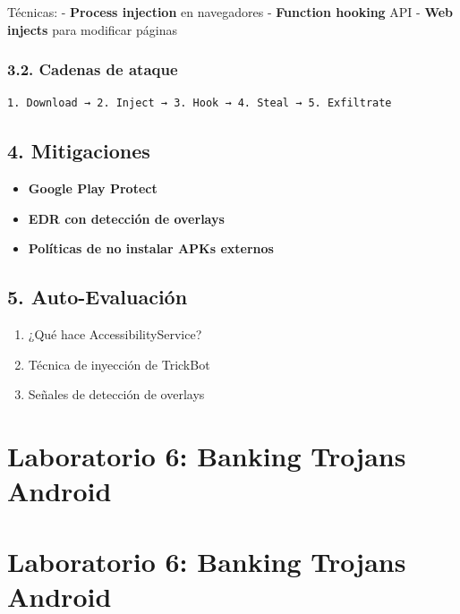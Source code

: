 \documentclass[
  letterpaper,
]{report}
\providecommand{\tightlist}{%
  \setlength{\itemsep}{0pt}\setlength{\parskip}{0pt}}
\begin{document}
Técnicas: - \textbf{Process injection} en navegadores - \textbf{Function
hooking} API - \textbf{Web injects} para modificar páginas

\subsection{3.2. Cadenas de ataque}\label{cadenas-de-ataque}

\begin{verbatim}
1. Download → 2. Inject → 3. Hook → 4. Steal → 5. Exfiltrate
\end{verbatim}

\section{4. Mitigaciones}\label{mitigaciones}

\begin{itemize}
\tightlist
\item
  \textbf{Google Play Protect}
\item
  \textbf{EDR con detección de overlays}
\item
  \textbf{Políticas de no instalar APKs externos}
\end{itemize}

\section{5. Auto-Evaluación}\label{auto-evaluaciuxf3n-5}

\begin{enumerate}
\def\labelenumi{\arabic{enumi}.}
\tightlist
\item
  ¿Qué hace AccessibilityService?
\item
  Técnica de inyección de TrickBot
\item
  Señales de detección de overlays
\end{enumerate}

\chapter{Laboratorio 6: Banking Trojans
Android}\label{laboratorio-6-banking-trojans-android}

\chapter{Laboratorio 6: Banking Trojans
Android}\label{laboratorio-6-banking-trojans-android-1}
\end{document}
